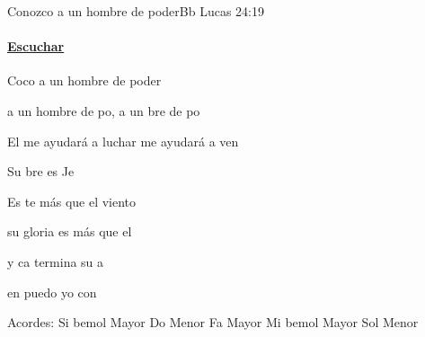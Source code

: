 \documentclass[12pt, spanish]{book}
\newcommand{\NotCCLIed}{\relax}
\begin{document}
    \begin{song}{Conozco a un hombre de poder}{Bb}
        {} %
        {}
        {Lucas 24:19} %
        {} %
        \ifChordBk
        \paragraph{\mbox{}\hfill\protect\href{https://open.spotify.com/intl-es/track/6eS6MBxWUEnRTE6lHJZMZ8}{Escuchar}\mbox{}\hfill}
        \fi

        \begin{SBOpGroup}
            Coco a un hombre de poder

            a un hombre de po, a un bre de po

            El me ayudará a luchar me ayudará a ven

            Su bre es Je
        \end{SBOpGroup}

        \begin{SBChorus}
            Es te más que el viento

            su gloria es más que el 

            y ca termina su a

            en  puedo yo con
        \end{SBChorus}

        \ifChordBk
        \begin{SBOpGroup}
            Acordes:
            \upchord{\Bflat}\qquad Si bemol Mayor \hfill
            \upchord{\Cm}\qquad Do Menor \hfill\null\break
            \upchord{\F}\qquad Fa Mayor \hfill
            \upchord{\Eflat}\qquad Mi bemol Mayor \hfill\null\break
            \upchord{\Gm}\qquad Sol Menor \hfill
        \end{SBOpGroup}
        \fi
    \end{song}
\end{document}
